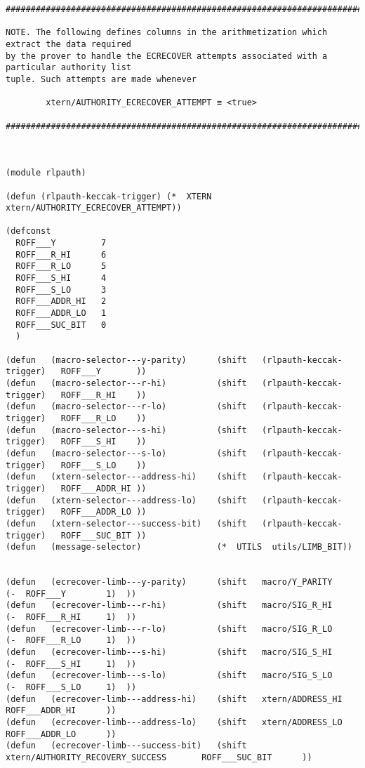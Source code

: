 \documentclass[varwidth=\maxdimen,margin=0.5cm,multi={verbatim}]{standalone}
\begin{document}
\begin{verbatim}
##########################################################################################

NOTE. The following defines columns in the arithmetization which extract the data required
by the prover to handle the ECRECOVER attempts associated with a particular authority list
tuple. Such attempts are made whenever

        xtern/AUTHORITY_ECRECOVER_ATTEMPT ≡ <true>

##########################################################################################



(module rlpauth)

(defun (rlpauth-keccak-trigger) (*  XTERN  xtern/AUTHORITY_ECRECOVER_ATTEMPT))

(defconst
  ROFF___Y         7
  ROFF___R_HI      6
  ROFF___R_LO      5
  ROFF___S_HI      4
  ROFF___S_LO      3
  ROFF___ADDR_HI   2
  ROFF___ADDR_LO   1
  ROFF___SUC_BIT   0
  )

(defun   (macro-selector---y-parity)      (shift   (rlpauth-keccak-trigger)   ROFF___Y       ))
(defun   (macro-selector---r-hi)          (shift   (rlpauth-keccak-trigger)   ROFF___R_HI    ))
(defun   (macro-selector---r-lo)          (shift   (rlpauth-keccak-trigger)   ROFF___R_LO    ))
(defun   (macro-selector---s-hi)          (shift   (rlpauth-keccak-trigger)   ROFF___S_HI    ))
(defun   (macro-selector---s-lo)          (shift   (rlpauth-keccak-trigger)   ROFF___S_LO    ))
(defun   (xtern-selector---address-hi)    (shift   (rlpauth-keccak-trigger)   ROFF___ADDR_HI ))
(defun   (xtern-selector---address-lo)    (shift   (rlpauth-keccak-trigger)   ROFF___ADDR_LO ))
(defun   (xtern-selector---success-bit)   (shift   (rlpauth-keccak-trigger)   ROFF___SUC_BIT ))
(defun   (message-selector)               (*  UTILS  utils/LIMB_BIT))


(defun   (ecrecover-limb---y-parity)      (shift   macro/Y_PARITY                     (-  ROFF___Y        1)  ))
(defun   (ecrecover-limb---r-hi)          (shift   macro/SIG_R_HI                     (-  ROFF___R_HI     1)  ))
(defun   (ecrecover-limb---r-lo)          (shift   macro/SIG_R_LO                     (-  ROFF___R_LO     1)  ))
(defun   (ecrecover-limb---s-hi)          (shift   macro/SIG_S_HI                     (-  ROFF___S_HI     1)  ))
(defun   (ecrecover-limb---s-lo)          (shift   macro/SIG_S_LO                     (-  ROFF___S_LO     1)  ))
(defun   (ecrecover-limb---address-hi)    (shift   xtern/ADDRESS_HI                       ROFF___ADDR_HI      ))
(defun   (ecrecover-limb---address-lo)    (shift   xtern/ADDRESS_LO                       ROFF___ADDR_LO      ))
(defun   (ecrecover-limb---success-bit)   (shift   xtern/AUTHORITY_RECOVERY_SUCCESS       ROFF___SUC_BIT      ))



\end{verbatim}
\end{document}
